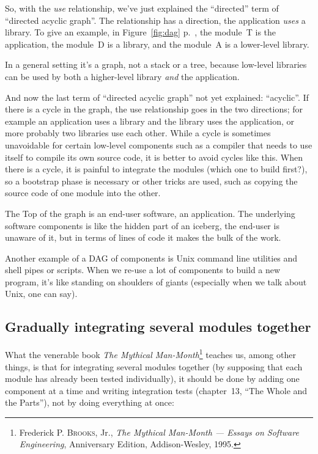 \documentclass[a4paper,11pt]{article}
\begin{document}
So, with the \emph{use} relationship, we've just explained the ``directed'' term of ``directed acyclic graph''. The relationship has a direction, the application \emph{uses} a library. To give an example, in Figure~\ref{fig:dag} p.~\pageref{fig:dag}, the module~T is the application, the module~D is a library, and the module~A is a lower-level library.

In a general setting it's a graph, not a stack or a tree, because low-level libraries can be used by both a higher-level library \emph{and} the application.

And now the last term of ``directed acyclic graph'' not yet explained: ``acyclic''. If there is a cycle in the graph, the use relationship goes in the two directions; for example an application uses a library and the library uses the application, or more probably two libraries use each other. While a cycle is sometimes unavoidable for certain low-level components such as a compiler that needs to use itself to compile its own source code, it is better to avoid cycles like this. When there is a cycle, it is painful to integrate the modules (which one to build first?), so a bootstrap phase is necessary or other tricks are used, such as copying the source code of one module into the other.

The Top of the graph is an end-user software, an application. The underlying software components is like the hidden part of an iceberg, the end-user is unaware of it, but in terms of lines of code it makes the bulk of the work.

Another example of a DAG of components is Unix command line utilities and shell pipes or scripts. When we re-use a lot of components to build a new program, it's like standing on shoulders of giants (especially when we talk about Unix, one can say).

\subsection{Gradually integrating several modules together}
\label{integration}

What the venerable book \emph{The Mythical Man-Month}\footnote{
Frederick P. \textsc{Brooks}, Jr.,
\emph{The Mythical Man-Month --- Essays on Software Engineering},
Anniversary Edition, Addison-Wesley, 1995.
} teaches us, among other things, is that for integrating several modules together (by supposing that each module has already been tested individually), it should be done by adding one component at a time and writing integration tests (chapter~13, ``The Whole and the Parts''), not by doing everything at once:
\end{document}

